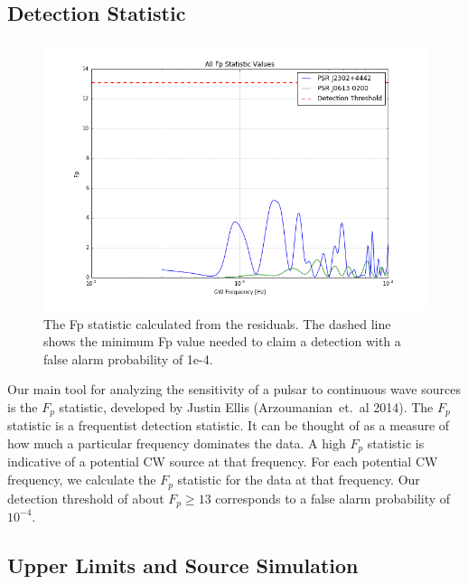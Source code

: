 \documentclass[12pt]{article}
\begin{document}
\subsection{Detection Statistic}

\begin{figure}[h!]
\caption{The Fp statistic calculated from the residuals. The dashed line shows
the minimum Fp value needed to claim a detection with a false alarm probability
of 1e-4.}
\includegraphics[width=\textwidth]{./figures/both_fp.png}
\end{figure}

    Our main tool for analyzing the sensitivity of a pulsar to continuous wave
sources is the $F_p$ statistic, developed by Justin Ellis (Arzoumanian~et.~al
2014). The
$F_p$ statistic is a frequentist detection statistic. It can be thought of as a
measure of how much a particular frequency dominates the data. A high $F_p$
statistic is indicative of a potential CW source at that frequency. For each
potential CW frequency, we calculate the $F_p$ statistic for the data at that
frequency. Our detection threshold of about $F_p \geq 13$ corresponds to a false
alarm probability of $10^{-4}$.

\subsection{Upper Limits and Source Simulation}
\end{document}
